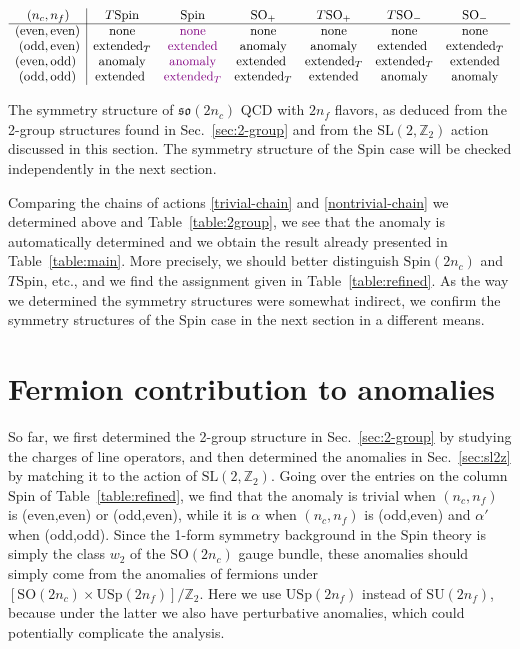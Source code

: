 \documentclass[12pt]{article}
\numberwithin{equation}{section}
\def\bZ{\mathbb{Z}}
\def\SU{\mathrm{SU}}
\def\SO{\mathrm{SO}}
\def\USp{\mathrm{USp}}
\def\so{\mathfrak{so}}
\def\Spin{\mathrm{Spin}}
\def\SL{\mathrm{SL}}
\begin{document}
\begin{table}
\centering
\[
\begin{array}{r@{\,}l|cccccc}
(n_c,&n_f)  & T\Spin & \Spin & \SO_+ & T\SO_+& T\SO_- & \SO_- \\
\hline
(\text{even},&\text{even}) & \text{none}& \color{Purple}\text{none}& \text{none}& \text{none}& \text{none}& \text{none}\\
(\text{odd},&\text{even}) & \text{\Textended} &\color{Purple}\text{extended} & \text{anomaly} & \text{anomaly} & \text{extended } & \text{\Textended} \\
(\text{even},&\text{odd}) & \text{anomaly} & \color{Purple}\text{anomaly} & \text{extended } & \text{\Textended}  & \text{\Textended} & \text{extended} \\
(\text{odd},&\text{odd}) & \text{extended } & \color{Purple}\text{\Textended} & \text{\Textended} & \text{extended}
 &  \text{anomaly} & \text{anomaly}   \end{array} 
\]
\caption{The symmetry structure of $\so(2n_c)$ QCD with $2n_f$ flavors,
as deduced from the 2-group structures found in Sec.~\ref{sec:2-group}
and from the $\SL(2,\bZ_2)$ action discussed in this section.
The symmetry structure of the $\Spin$ case will be checked independently in the next section.
\label{table:refined}}
\end{table}


Comparing the chains of actions \eqref{trivial-chain} and \eqref{nontrivial-chain} we determined above 
and Table~\ref{table:2group},
we see that the anomaly is automatically determined and 
we obtain the result already presented in Table~\ref{table:main}.
More precisely, we should better distinguish $\Spin(2n_c)$ and $T\Spin$, etc.,
and we find the assignment given in Table~\ref{table:refined}.
As the way we determined the symmetry structures were somewhat indirect,
we confirm the symmetry structures of the $\Spin$ case in the next section
in a different means.

\section{Fermion contribution to anomalies}
So far, we first determined the 2-group structure in Sec.~\ref{sec:2-group} by studying the charges of line operators,
and then determined the anomalies in Sec.~\ref{sec:sl2z} by matching it to the action of $\SL(2,\bZ_2)$.
Going over  the entries on the column $\Spin$ of Table~\ref{table:refined},
we find that the anomaly is trivial when $(n_c,n_f)$ is (even,even) or (odd,even),
while it is $\alpha$ when $(n_c,n_f)$ is (odd,even) and $\alpha'$ when (odd,odd).
Since the 1-form symmetry background in the $\Spin$ theory is simply the class $w_2$ of the $\SO(2n_c)$ gauge bundle, 
these anomalies should simply come from the anomalies of fermions under $[\SO(2n_c)\times \USp(2n_f)]/\bZ_2$.
Here we use $\USp(2n_f)$ instead of $\SU(2n_f)$, because under the latter we also have perturbative anomalies, which could potentially complicate the analysis.
\end{document}

